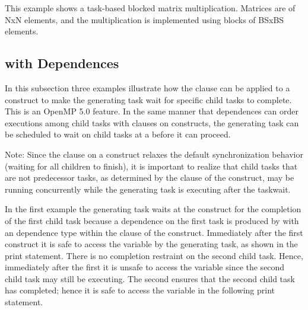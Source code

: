 This example shows a task-based blocked matrix multiplication. Matrices are of 
NxN elements, and the multiplication is implemented using blocks of BSxBS elements.



\subsection{ with Dependences}
\label{subsec:taskwait_depend}

In this subsection three examples illustrate how the
 clause can be applied to a  construct to make the
generating task wait for specific child tasks to complete. This is an OpenMP 5.0 feature.
 In the same manner that
dependences can order executions among child tasks with  clauses on
 constructs, the generating task can be scheduled to wait on child tasks
at a  before it can proceed.

Note: Since the  clause on a  construct relaxes the
default synchronization behavior (waiting for all children to finish), it is important to
realize that child tasks that are not predecessor tasks, as determined by the 
clause of the  construct, may be running concurrently while the
generating task is executing after the taskwait.

In the first example the generating task waits at the  construct
for the completion of the first child task because a dependence on the first task
is produced by  with an  dependence type within the 
clause of the  construct.
Immediately after the first  construct it is safe to access the
 variable by the generating task, as shown in the print statement.
There is no completion restraint on the second child task.
Hence, immediately after the first  it is unsafe to access the
 variable since the second child task may still be executing.
The second  ensures that the second child task has completed; hence
it is safe to access the  variable in the following print statement.

